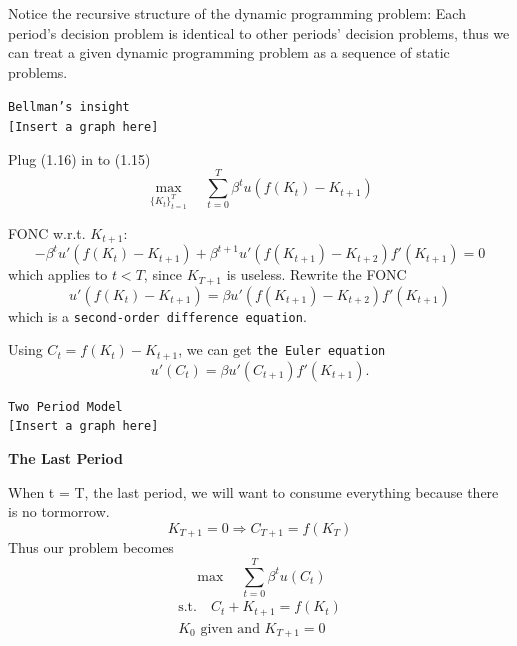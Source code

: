 \documentclass[twoside]{article}
\begin{document}
Notice the recursive structure of the dynamic programming problem: Each period's decision problem is identical to other periods' decision problems, thus we can treat a given dynamic programming problem as a sequence of static problems.

\begin{center}
  \texttt{Bellman's insight}\\
  \texttt{[Insert a graph here]}
\end{center}

Plug (1.16) in to (1.15)
\begin{equation}
  \max_{\{K_{t}\}_{t=1}^{T}} \quad \sum_{t=0}^T \beta^t u( f(K_t) - K_{t+1})
\end{equation}

FONC w.r.t. $K_{t+1}$:
\begin{equation}
  - \beta^t u'(f(K_{t}) - K_{t+1}) + \beta^{t+1} u'(f(K_{t+1})-K_{t+2})f'(K_{t+1}) = 0
\end{equation}
which applies to $ t < T$, since $K_{T+1}$ is useless. Rewrite the FONC
\begin{equation}
   u'(f(K_{t}) - K_{t+1}) = \beta u'(f(K_{t+1})-K_{t+2})f'(K_{t+1})
\end{equation}
which is a \texttt{second-order difference equation}.

Using $C_t = f(K_{t}) - K_{t+1}$, we can get \texttt{the Euler equation}
\begin{equation}
  u'(C_t) = \beta u'(C_{t+1})f'(K_{t+1}).
\end{equation}

\begin{center}
  \texttt{Two Period Model}\\
  \texttt{[Insert a graph here]}
\end{center}

{\bf The Last Period}

When t = T, the last period, we will want to consume everything because there is no tormorrow.
\[
K_{T+1} = 0 \Longrightarrow C_{T+1} = f(K_T)
\]
Thus our problem becomes
\begin{equation}
  \max \quad \sum_{t=0}^T \beta^t u(C_t)
\end{equation}
\begin{equation}
\begin{aligned}
  \text{s.t.} \quad C_t + K_{t+1} = f(K_t) \\
  K_0 \text{~given and~} K_{T+1} = 0
\end{aligned}
\end{equation}
\end{document}
